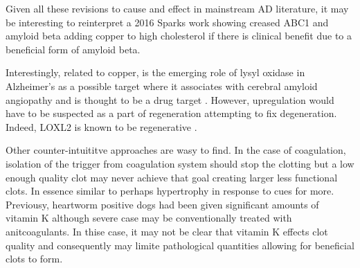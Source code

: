 {Given all these revisions to cause and effect in mainstream AD literature,
it may be interesting to reinterpret a 2016 Sparks work showing
creased ABC1 and amyloid beta adding copper to high cholesterol
\cite{PMC4643214} if there is clinical benefit due to a beneficial
form of amyloid beta. 

Interestingly, related to copper,
is the emerging role of lysyl oxidase in Alzheimer's
as a possible target 
where it associates with cerebral amyloid angiopathy and
is thought to be a drug target 
\cite{Kelly_Sharp_Thomas_Targeting_lysyl_oxidase_2023}
\cite{PMC11042178}. However,  upregulation would have to be
suspected as a part of regeneration attempting to fix
degeneration. 
Indeed, LOXL2 is known to be regenerative
\cite{Tashkandi_Alsaqer_Alhousami_LOXL2_promotes_aggrecan_2020}.

Other counter-intuititve approaches are wasy to find. 
In the case of coagulation, isolation of the trigger from 
coagulation system should stop the clotting but a low enough
quality clot may never achieve that goal creating larger
less functional clots.  In essence similar to perhaps hypertrophy
in response to cues for more.  
Previousy, heartworm positive dogs had been given
significant amounts of vitamin K
\cite{mmarchywka-MJM-2021-003-v0.50rg}
\cite{mmarchywka-MJM-2019-001-.1li}
 although severe
case may be conventionally treated with anitcoagulants. In thise
case, it may not be clear that vitamin K effects clot
quality and consequently may limite pathological quantities
allowing for beneficial clots to form. 

} %


\newcommand{\mjmcubp}{
Blood peressure, which is not a clinical endpoint per se ,
has been associated with copper status. While it is not 
central to this work, it illustrates some of the issues
introduced above and is good context for the current
work on clinical diseases.

A 2021 work exploring the association between serum copper
levels and hypertension in US children and adolescents
stated
\cite{Liu_Liao_Zhu_association_between_serum_2021}
"
As suggested by previous literature, serum copper appears to reflect the status of copper nutrition in both depleted and replete populations. "
The present work however tends to accept that ceruloplasmin and
blood copper levels are a reaction to stresses such as infection
and a high level simply indicates some other pathological process
likely exists.  While blood levels can be elevated in response to
a stress, its not known how well other functions 
such as electron transport are able to continue. 

As erly as 1993, one work with Dahl salt-sensitive rats
suggested that indeed copper blood levels were a response
to hypertension 
\cite{Garrow_Clegg_Metzler_Influence_hypertension_1991}.

Things that do matter to the host  related to blood pressure include
cardiac workload,
vascular pressure hhandling limits and adequate nutrient delivery.
Any of these are likely complicated functions of long term diet
details. 
} %

